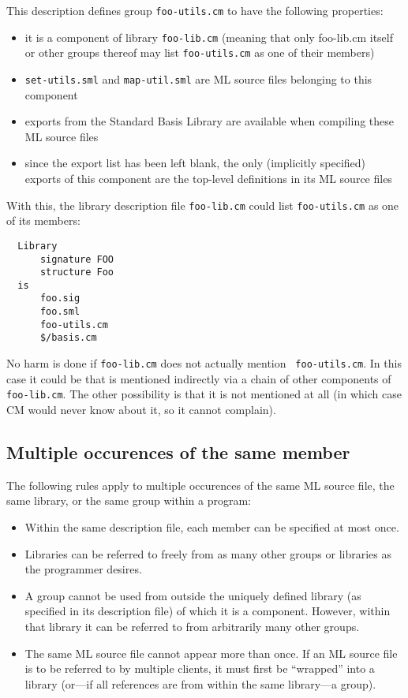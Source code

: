 \documentclass[titlepage,letterpaper]{article}
\begin{document}
This description defines group {\tt foo-utils.cm} to have the
following properties:

\begin{itemize}
\item it is a component of library {\tt foo-lib.cm} (meaning that only
foo-lib.cm itself or other groups thereof may list {\tt foo-utils.cm} as one
of their members)
\item {\tt set-utils.sml} and {\tt map-util.sml} are ML source files
belonging to this component
\item exports from the Standard Basis Library are available when
compiling these ML source files
\item since the export list has been left blank, the only (implicitly
specified) exports of this component are the top-level definitions in
its ML source files
\end{itemize}

With this, the library description file {\tt foo-lib.cm} could list
{\tt foo-utils.cm} as one of its members:

\begin{verbatim}
  Library
      signature FOO
      structure Foo
  is
      foo.sig
      foo.sml
      foo-utils.cm
      $/basis.cm
\end{verbatim}

No harm is done if {\tt foo-lib.cm} does not actually mention {\tt
foo-utils.cm}.  In this case it could be that is mentioned indirectly via a chain of other components
of {\tt foo-lib.cm}.  The other possibility is that it is not
mentioned at all (in which case CM would never know about it, so it
cannot complain).

\subsection{Multiple occurences of the same member}
\label{sec:multioccur}

The following rules apply to multiple occurences of the same ML source
file, the same library, or the same group within a program:

\begin{itemize}
\item Within the same description file, each member can be specified
at most once.
\item Libraries can be referred to freely from as many other groups or
libraries as the programmer desires.
\item A group cannot be used from outside the uniquely defined library
(as specified in its description file) of which it is a component.
However, within that library it can be referred to from arbitrarily
many other groups.
\item The same ML source file cannot appear more than once.  If an ML
source file is to be referred to by multiple clients, it must first be
``wrapped'' into a library (or---if all references are from within the
same library---a group).
\end{itemize}
\end{document}
